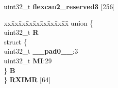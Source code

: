 \begin{DoxyCompactItemize}
\begin{tabbing}
\end{tabbing}\item 
\mbox{\label{structFLEXCAN2__tag_a3fd5e574b5ff25a5d825a732dafb11f4}} 
uint32\+\_\+t {\bfseries flexcan2\+\_\+reserved3} \mbox{[}256\mbox{]}
\item 
\mbox{\label{structFLEXCAN2__tag_a6e384e4462669e6a3bef1ee02b169c04}} 
\begin{tabbing}
xx\=xx\=xx\=xx\=xx\=xx\=xx\=xx\=xx\=\kill
union \{\\
\>uint32\_t {\bfseries R}\\
\>struct \{\\
\>\>uint32\_t {\bfseries \_\_pad0\_\_}:3\\
\>\>uint32\_t {\bfseries MI}:29\\
\>\} {\bfseries B}\\
\} {\bfseries RXIMR} \mbox{[}64\mbox{]}\\


\end{tabbing}
\end{DoxyCompactItemize}
